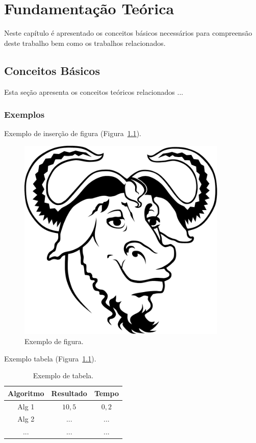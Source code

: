 \chapter[Fundamentação Teórica]{Fundamentação Teórica}

Neste capítulo é apresentado os conceitos básicos necessários para compreensão deste trabalho bem como os trabalhos relacionados.

\section{Conceitos Básicos}

Esta seção apresenta os conceitos teóricos relacionados ...

\subsection{Exemplos}

Exemplo de inserção de figura (Figura~\ref{fig:figura}).
\begin{figure}[htb]
    \centering
    \includegraphics[width=10cm]{figuras/Heckert_GNU_white}
    \caption{Exemplo de figura.}
    \label{fig:figura}
\end{figure}

Exemplo tabela (Figura~\ref{tab:tabela}).
\begin{table}[htb]
    \centering
    \caption{Exemplo de tabela.}
    \begin{tabular}{c|cc}
        \hline
        Algoritmo & Resultado & Tempo\\
        \hline
        Alg 1 & $10,5$ & $0,2$\\
        Alg 2 & ... & ...\\
        ... & ... & ...\\
        \hline
    \end{tabular}
    \label{tab:tabela}
\end{table}

